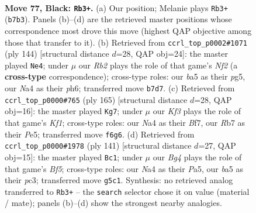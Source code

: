 \documentclass[11pt]{article}
\begin{document}
\clearpage

\begin{figure}[p]\centering
\begin{subfigure}{0.46\textwidth}\centering
\resizebox{\linewidth}{!}{%
\newchessgame
\chessboard[
  setfen={8/1r6/3p1k1p/B3p1b1/n3P2p/3K1P2/7R/8 b - - 3 77},
  showmover=false,
  pgfstyle=straightmove, color=movearrow, markmove={b7-b3}
]}
\caption{}
\end{subfigure}\hfill
\begin{subfigure}{0.46\textwidth}\centering
\resizebox{\linewidth}{!}{%
\newchessgame
\chessboard[
  setfen={8/5p1k/4pP1p/1P2P1p1/8/1r5P/5N2/5BK1 w - - 3 73},
  showmover=false,
  pgfstyle=straightmove, color=movearrow, markmove={f2-e4}
]}
\caption{}
\end{subfigure}
\\[4pt]
\begin{subfigure}{0.46\textwidth}\centering
\resizebox{\linewidth}{!}{%
\newchessgame
\chessboard[
  setfen={5k2/4bb2/1R3pp1/4p2p/7P/2N2PP1/6K1/8 b - - 62 83},
  showmover=false,
  pgfstyle=straightmove, color=movearrow, markmove={f8-g7}
]}
\caption{}
\end{subfigure}\hfill
\begin{subfigure}{0.46\textwidth}\centering
\resizebox{\linewidth}{!}{%
\newchessgame
\chessboard[
  setfen={6R1/8/2p5/p1k1p1p1/5b2/2PK1P2/8/8 b - - 28 71},
  showmover=false,
  pgfstyle=straightmove, color=movearrow, markmove={f4-c1}
]}
\caption{}
\end{subfigure}
\caption{\textbf{Move 77, Black: \texttt{Rb3+}.} (a) Our position; Melanie plays \texttt{Rb3+} (\texttt{b7b3}). Panels (b)--(d) are the retrieved master positions whose correspondence most drove this move (highest QAP objective among those that transfer to it). (b) Retrieved from \texttt{ccrl\_top\_p0002\#1071} (ply 144) [structural distance $d$=28, QAP obj=24]: the master played \texttt{Ne4}; under $\mu$ our \emph{Rb2} plays the role of that game's \emph{Nf2} (a \textbf{cross-type} correspondence); cross-type roles: our \emph{b}a5 as their \emph{p}g5, our \emph{N}a4 as their \emph{p}h6; transferred move \texttt{b7d7}. (c) Retrieved from \texttt{ccrl\_top\_p0000\#765} (ply 165) [structural distance $d$=28, QAP obj=16]: the master played \texttt{Kg7}; under $\mu$ our \emph{Kf3} plays the role of that game's \emph{Kf1}; cross-type roles: our \emph{N}a4 as their \emph{B}f7, our \emph{R}b7 as their \emph{P}e5; transferred move \texttt{f6g6}. (d) Retrieved from \texttt{ccrl\_top\_p0000\#1978} (ply 141) [structural distance $d$=27, QAP obj=15]: the master played \texttt{Bc1}; under $\mu$ our \emph{Bg4} plays the role of that game's \emph{Bf5}; cross-type roles: our \emph{N}a4 as their \emph{P}a5, our \emph{b}a5 as their \emph{p}c3; transferred move \texttt{g5c1}. Synthesis: no retrieved analog transferred to \texttt{Rb3+} -- the \texttt{search} selector chose it on value (material / mate); panels (b)--(d) show the strongest nearby analogies.}
\label{fig:thought-m153}
\end{figure}
\end{document}

